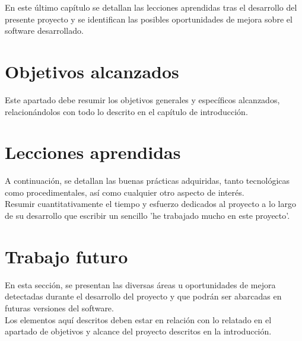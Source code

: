 

En este último capítulo se detallan las lecciones aprendidas tras el desarrollo del presente proyecto y se identifican las posibles oportunidades de mejora sobre el software desarrollado.

\section{Objetivos alcanzados}
Este apartado debe resumir los objetivos generales y específicos alcanzados, relacionándolos con todo lo descrito en el capítulo de introducción.\\

\section{Lecciones aprendidas}
A continuación, se detallan las buenas prácticas adquiridas, tanto tecnológicas como procedimentales, así como cualquier otro aspecto de interés.\\
Resumir cuantitativamente el tiempo y esfuerzo dedicados al proyecto a lo largo de su desarrollo que escribir un sencillo 'he trabajado mucho en este proyecto'.

\section{Trabajo futuro}
En esta sección, se presentan las diversas áreas u oportunidades de mejora detectadas durante el desarrollo del proyecto y que podrán ser abarcadas en futuras versiones del software.\\

Los elementos aquí descritos deben estar en relación con lo relatado en el apartado de objetivos y alcance del proyecto descritos en la introducción.

